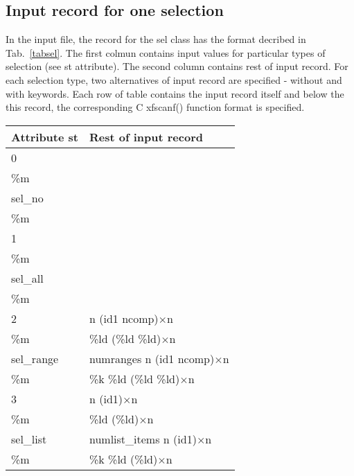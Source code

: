 \subsection {Input record for one selection} \label{irecsel}
In the input file, the record for the {\sf sel} class has the format decribed in 
Tab.~\ref{tabsel}. The first colmun contains input values for particular types of selection 
(see {\sf st} attribute). The second column contains rest of input record. For each selection 
type, two alternatives of input record are specified - without and with keywords. Each row 
of table contains the input record itself and below the this record, the corresponding C 
{\sf xfscanf()} function format is specified.

\begin{table}[!p]
\begin{center}
\begin{tabular}{||l|l||}
\hline
\hline
Attribute {\sf st} & Rest of input record\\
\hline
\hline

0             &  \\
{\sf \%m}     &  \\ 
\cline{1-2}
{\sf sel\_no} &  \\
{\sf \%m}     &  \\ 

\hline
\hline

1              &  \\
{\sf \%m}      &  \\
\cline{1-2}
{\sf sel\_all} &  \\
{\sf \%m}      &  \\

\hline
\hline

2                & {\sf n} ({\sf id1} {\sf ncomp})$\times${\sf n}   \\
{\sf \%m}        &  {\sf \%ld} ({\sf \%ld \%ld})$\times${\sf n} \\
\cline{1-2}
{\sf sel\_range} & {\sf numranges} {\sf n} ({\sf id1} {\sf ncomp})$\times${\sf n}   \\
{\sf \%m}        & {\sf \%k \%ld} ({\sf \%ld \%ld})$\times${\sf n}  \\

\hline
\hline

3               &  {\sf n} ({\sf id1})$\times${\sf n}  \\
{\sf \%m}       &  {\sf \%ld} ({\sf \%ld})$\times${\sf n}      \\
\cline{1-2}
{\sf sel\_list} &  {\sf numlist\_items } {\sf n} ({\sf id1})$\times${\sf n}  \\
{\sf \%m}       &  {\sf \%k \%ld} ({\sf \%ld})$\times${\sf n}      \\


\end{tabular}
\end{center}
\end{table}
